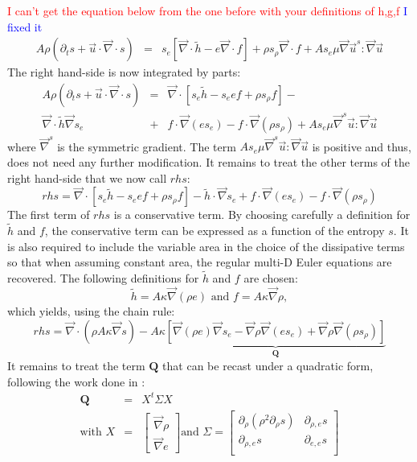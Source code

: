 \documentclass[preprint,10pt]{elsarticle}
\renewcommand{\div}{\vec{\nabla}\! \cdot \!}
\newcommand{\grad}{\vec{\nabla}}
\newcommand{\tcr}[1]{\textcolor{red}{#1}}
\newcommand{\tcb}[1]{\textcolor{blue}{#1}}
\begin{document}
\tcr{I can't get the equation below from the one before with your definitions of h,g,f} \tcb{I fixed it}
%
\begin{eqnarray}
\label{eq:ent_res_app2}
A \rho \left( \partial_t s + \vec{u} \cdot \div s \right) &=& s_e \left[ \div \tilde{h}-e \div f \right] + \rho s_{\rho} \div f  + A s_e \mu \grad \vec{u}^s : \grad \vec{u}\nonumber
\end{eqnarray}
%
The right hand-side is now integrated by parts:
%
\begin{eqnarray}
\label{eq:ent_res_app3}
A \rho \left( \partial_t s + \vec{u} \cdot \div s \right) &=& \div \left[ s_e \tilde{h}-s_e e f  + \rho s_{\rho} f \right] -\nonumber \\
\div \tilde{h} \grad s_e  &+& f \cdot \grad (e s_e) -  f \cdot \grad ( \rho s_{\rho} ) + A s_e \mu \grad^s \vec{u} : \grad \vec{u} \nonumber
\end{eqnarray}
%
where $\grad^s$ is the symmetric gradient. The term $A s_e \mu \grad^s \vec{u} : \grad \vec{u}$ is positive and thus, does not need any further modification. It %
remains to treat the other terms of the right hand-side that we now call $rhs$:
%
\begin{equation}
rhs = \div \left[ s_e \tilde{h}-s_e e f  + \rho s_{\rho} f \right] - \tilde{h} \cdot \grad s_e  + f \cdot \grad (e s_e) - f \cdot \grad ( \rho s_{\rho} ) \nonumber
\end{equation}
%
The first term of $rhs$ is a conservative term. By choosing carefully a definition for $\tilde{h}$ and $f$, the conservative term can be expressed as a function of the entropy $s$. It is also required to include the variable area in the choice of the dissipative terms so that when assuming constant area, the regular multi-D Euler equations are recovered. The following definitions for $\tilde{h}$ and $f$ are chosen:
%
\begin{equation}
\tilde{h} = A \kappa \grad ( \rho e ) \text{ and } f = A \kappa \grad \rho, \nonumber 
\end{equation}
%
which yields, using the chain rule:
%
\begin{equation}
rhs = \div (\rho A \kappa \grad s ) - A \kappa \underbrace{\left[ \grad (\rho e) \grad s_e  - \grad \rho \grad (e s_e) +  \grad \rho \grad ( \rho s_{\rho} )  \right]}_{\mathbf{Q}} \nonumber
\end{equation}
%
It remains to treat the term $\mathbf{Q}$ that can be recast under a quadratic form, following the work done in \cite{jlg}:
%
\begin{eqnarray}
\mathbf{Q} &=& X^t \Sigma X \nonumber \\
\text{with } X &=& \begin{bmatrix}
\grad \rho \\
\grad e 
\end{bmatrix}
\text{and } \Sigma = \begin{bmatrix}
       \partial_{\rho} (\rho^2 \partial_{\rho} s) & \partial_{\rho,e} s  \\[0.3em]
       \partial_{\rho,e} s & \partial_{e,e} s           \\[0.3em]
     \end{bmatrix} \nonumber 
\end{eqnarray}
\end{document}
